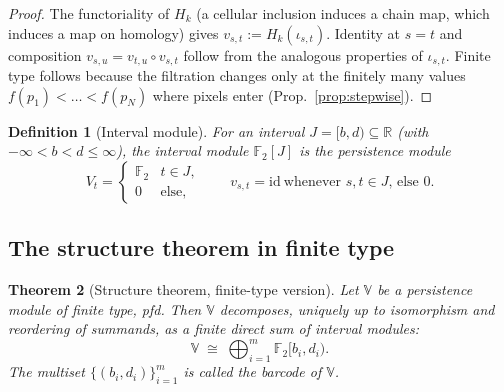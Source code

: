 \documentclass[11pt]{article}
\theoremstyle{persdef}
\newtheorem{definition}{Definition}[section]
\newtheorem{theorem}[definition]{Theorem}
\newcommand{\R}{\mathbb{R}}
\newcommand{\F}{\mathbb{F}}
\newcommand{\Ftwo}{\F_2}
\newcommand{\Hk}[1]{H_{#1}}
\begin{document}
\begin{proof}
The functoriality of $\Hk{k}$ (a cellular inclusion induces a chain map, which induces a map on homology) gives $v_{s,t}:=\Hk{k}(\iota_{s,t})$. Identity at $s=t$ and composition $v_{s,u}=v_{t,u}\circ v_{s,t}$ follow from the analogous properties of $\iota_{s,t}$. Finite type follows because the filtration changes only at the finitely many values $f(p_1)<\dots<f(p_N)$ where pixels enter (Prop.\ \ref{prop:stepwise}).
\end{proof}

\begin{definition}[Interval module]\label{def:interval}
For an interval $J=[b,d)\subseteq\R$ (with $-\infty<b<d\leq\infty$), the \emph{interval module} $\Ftwo[J]$ is the persistence module
\[
V_t = \begin{cases} \Ftwo & t\in J,\\ 0 & \text{else,}\end{cases}\qquad v_{s,t} = \mathrm{id}\ \text{whenever $s,t\in J$, else }0.
\]
\end{definition}

\subsection{The structure theorem in finite type}

\begin{theorem}[Structure theorem, finite-type version]\label{thm:structureft}
Let $\mathbb{V}$ be a persistence module of finite type, pfd. Then $\mathbb{V}$ decomposes, uniquely up to isomorphism and reordering of summands, as a finite direct sum of interval modules:
\[
\mathbb{V} \;\cong\; \bigoplus_{i=1}^{m} \Ftwo[b_i,d_i).
\]
The multiset $\{(b_i,d_i)\}_{i=1}^m$ is called the \emph{barcode} of $\mathbb{V}$.
\end{theorem}
\end{document}
